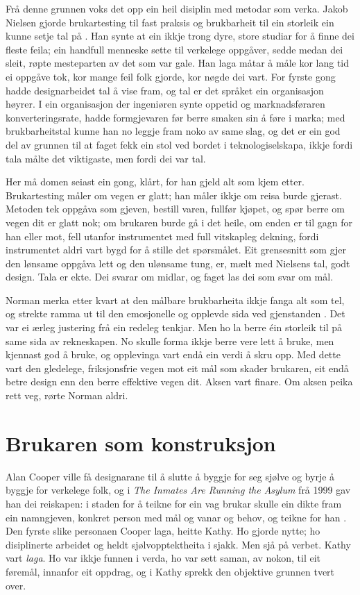 Frå denne grunnen voks det opp ein heil disiplin med metodar som verka. Jakob Nielsen gjorde brukartesting til fast praksis og brukbarheit til ein storleik ein kunne setje tal på \autocite{nielsen1993}. Han synte at ein ikkje trong dyre, store studiar for å finne dei fleste feila; ein handfull menneske sette til verkelege oppgåver, sedde medan dei sleit, røpte mesteparten av det som var gale. Han laga måtar å måle kor lang tid ei oppgåve tok, kor mange feil folk gjorde, kor nøgde dei vart. For fyrste gong hadde designarbeidet tal å vise fram, og tal er det språket ein organisasjon høyrer. I ein organisasjon der ingeniøren synte oppetid og marknadsføraren konverteringsrate, hadde formgjevaren før berre smaken sin å føre i marka; med brukbarheitstal kunne han no leggje fram noko av same slag, og det er ein god del av grunnen til at faget fekk ein stol ved bordet i teknologiselskapa, ikkje fordi tala målte det viktigaste, men fordi dei var tal.

Her må domen seiast ein gong, klårt, for han gjeld alt som kjem etter. Brukartesting måler om vegen er glatt; han måler ikkje om reisa burde gjerast. Metoden tek oppgåva som gjeven, bestill varen, fullfør kjøpet, og spør berre om vegen dit er glatt nok; om brukaren burde gå i det heile, om enden er til gagn for han eller mot, fell utanfor instrumentet med full vitskapleg dekning, fordi instrumentet aldri vart bygd for å stille det spørsmålet. Eit grensesnitt som gjer den lønsame oppgåva lett og den ulønsame tung, er, mælt med Nielsens tal, godt design. Tala er ekte. Dei svarar om midlar, og faget las dei som svar om mål.

Norman merka etter kvart at den målbare brukbarheita ikkje fanga alt som tel, og strekte ramma ut til den emosjonelle og opplevde sida ved gjenstanden \autocite{norman2004emotional}. Det var ei ærleg justering frå ein redeleg tenkjar. Men ho la berre éin storleik til på same sida av rekneskapen. No skulle forma ikkje berre vere lett å bruke, men kjennast god å bruke, og opplevinga vart endå ein verdi å skru opp. Med dette vart den gledelege, friksjonsfrie vegen mot eit mål som skader brukaren, eit endå betre design enn den berre effektive vegen dit. Aksen vart finare. Om aksen peika rett veg, rørte Norman aldri.

\section{Brukaren som konstruksjon}

Alan Cooper ville få designarane til å slutte å byggje for seg sjølve og byrje å byggje for verkelege folk, og i \textit{The Inmates Are Running the Asylum} frå 1999 gav han dei reiskapen: i staden for å teikne for ein vag brukar skulle ein dikte fram ein namngjeven, konkret person med mål og vanar og behov, og teikne for han \autocite{cooper1999inmates}. Den fyrste slike personaen Cooper laga, heitte Kathy. Ho gjorde nytte; ho disiplinerte arbeidet og heldt sjølvopptektheita i sjakk. Men sjå på verbet. Kathy vart \emph{laga}. Ho var ikkje funnen i verda, ho var sett saman, av nokon, til eit føremål, innanfor eit oppdrag, og i Kathy sprekk den objektive grunnen tvert over.

